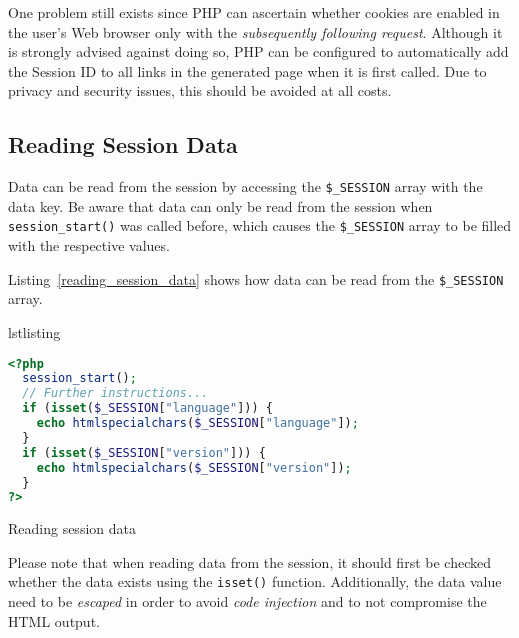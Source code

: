 \documentclass[a4paper, justified, notoc]{tufte-handout} %
\makeatletter
\newenvironment{listing}[1][htbp]
  {\ifvmode\else\unskip\fi\begin{@tufte@float}[#1]{lstlisting}{}}
  {\end{@tufte@float} } %
\makeatother
\begin{document}
One problem still exists since PHP can ascertain whether cookies are enabled in the user's Web browser only with the \emph{subsequently following request}. Although it is strongly advised against doing so, PHP can be configured to automatically add the Session ID to all links in the generated page when it is first called. Due to privacy and security issues, this should be avoided at all costs.


\subsection{Reading Session Data} %
\label{sub:reading_session_data}
Data can be read from the session by accessing the \texttt{\$\_SESSION} array with the data key.
Be aware that data can only be read from the session when \texttt{session\_start()} was called before, which causes the \texttt{\$\_SESSION} array to be filled with the respective values. 

Listing~\ref{reading_session_data} shows how data can be read from the \texttt{\$\_SESSION} array. 
\begin{listing}
\begin{lstlisting}[language=PHP]
<?php
  session_start();
  // Further instructions...
  if (isset($_SESSION["language"])) {
    echo htmlspecialchars($_SESSION["language"]);
  }
  if (isset($_SESSION["version"])) {
    echo htmlspecialchars($_SESSION["version"]);
  }
?>
\end{lstlisting}
	\caption{Reading session data}
	\label{reading_session_data}
\end{listing}

Please note that when reading data from the session, it should first be checked whether the data exists using the \texttt{isset()} function. Additionally, the data value need to be \emph{escaped} in order to avoid \emph{code injection} and to not compromise the HTML output. 
\end{document}
